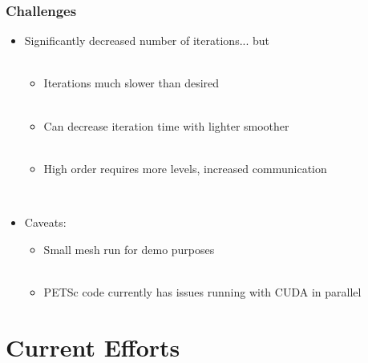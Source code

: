 \documentclass{beamer}
\begin{document}
\begin{frame}
\begin{center}
\frametitle{Challenges}

\begin{itemize}

\item Significantly decreased number of iterations... but\\

~\\

\begin{itemize}

\item Iterations much slower than desired\\

~\\

\item Can decrease iteration time with lighter smoother\\

~\\

\item High order requires more levels, increased communication\\

\end{itemize}

~\\

\item Caveats:

\begin{itemize}

\item Small mesh run for demo purposes\\

~\\

\item PETSc code currently has issues running with CUDA in parallel

\end{itemize}

\end{itemize}

\end{center}
\end{frame}

\section{Current Efforts}
\end{document}
